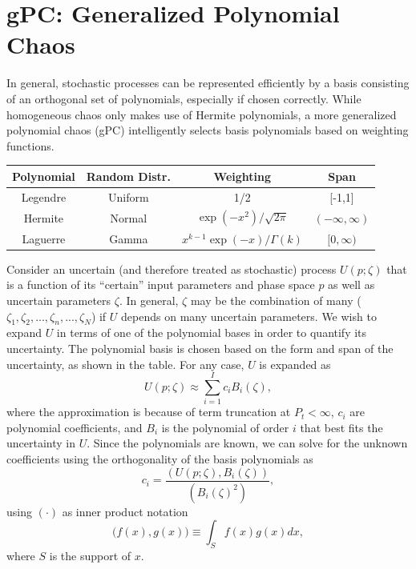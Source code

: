 \section{gPC: Generalized Polynomial Chaos}
In general, stochastic processes can be represented efficiently by a basis consisting of an orthogonal set of polynomials, especially if chosen correctly.  While homogeneous chaos only makes use of Hermite polynomials, a more generalized polynomial chaos (gPC) intelligently selects basis polynomials based on weighting functions.
\begin{center}
\begin{tabular}{c c c c}
Polynomial & Random Distr. & Weighting & Span \\ \hline
Legendre & Uniform & 1/2 & [-1,1] \\
Hermite & Normal &  $\exp(-x^2)/\sqrt{2\pi}$ & $(-\infty,\infty)$ \\
Laguerre & Gamma & $x^{k-1}\exp(-x)/\Gamma(k)$ & $[0,\infty)$
\end{tabular}
\end{center}
Consider an uncertain (and therefore treated as stochastic) process $U(p;\zeta)$ that is a function of its ``certain'' input parameters and phase space $p$ as well as uncertain parameters $\zeta$.  In general, $\zeta$ may be the combination of many ($\zeta_1,\zeta_2,...,\zeta_n,...,\zeta_N$) if $U$ depends on many uncertain parameters.  We wish to expand $U$ in terms of one of the polynomial bases in order to quantify its uncertainty.  The polynomial basis is chosen based on the form and span of the uncertainty, as shown in the table.  For any case, $U$ is expanded as
\begin{equation}
U(p;\zeta)\approx\sum_{i=1}^{I} c_i B_i(\zeta),
\end{equation}
where the approximation is because of term truncation at $P_t<\infty$, $c_i$ are polynomial coefficients, and $B_i$ is the polynomial of order $i$ that best fits the uncertainty in $U$.  Since the polynomials are known, we can solve for the unknown coefficients using the orthogonality of the basis polynomials as
\begin{equation}
c_i=\frac{(U(p;\zeta),B_i(\zeta))}{(B_i(\zeta)^2)},
\end{equation}
using $(\cdot)$ as inner product notation
\begin{equation}
\big(f(x),g(x) \big)\equiv \int_S f(x)g(x)dx,
\end{equation}
where $S$ is the support of $x$.


